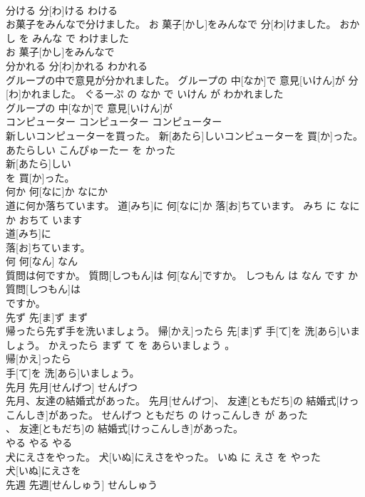 \documentclass[8pt]{extreport}
\begin{document}
\begin{CJK}{UTF8}{min}
\\	分ける	分[わ]ける	わける	
\\	お菓子をみんなで分けました。	お 菓子[かし]をみんなで 分[わ]けました。	おかし を みんな で わけました	
\\	お 菓子[かし]をみんなで
\\	分かれる	分[わ]かれる	わかれる	
\\	グループの中で意見が分かれました。	グループの 中[なか]で 意見[いけん]が 分[わ]かれました。	ぐるーぷ の なか で いけん が わかれました	
\\	グループの 中[なか]で 意見[いけん]が
\\	コンピューター	コンピューター	コンピューター	
\\	新しいコンピューターを買った。	新[あたら]しいコンピューターを 買[か]った。	あたらしい こんぴゅーたー を かった	
\\	新[あたら]しい
\\	を 買[か]った。			
\\	何か	何[なに]か	なにか	
\\	道に何か落ちています。	道[みち]に 何[なに]か 落[お]ちています。	みち に なにか おちて います	
\\	道[みち]に
\\	落[お]ちています。			
\\	何	何[なん]	なん	
\\	質問は何ですか。	質問[しつもん]は 何[なん]ですか。	しつもん は なん です か	
\\	質問[しつもん]は
\\	ですか。			
\\	先ず	先[ま]ず	まず	
\\	帰ったら先ず手を洗いましょう。	帰[かえ]ったら 先[ま]ず 手[て]を 洗[あら]いましょう。	かえったら まず て を あらいましょう 。	
\\	帰[かえ]ったら
\\	手[て]を 洗[あら]いましょう。			
\\	先月	先月[せんげつ]	せんげつ	
\\	先月、友達の結婚式があった。	先月[せんげつ]、 友達[ともだち]の 結婚式[けっこんしき]があった。	せんげつ ともだち の けっこんしき が あった	
\\	、 友達[ともだち]の 結婚式[けっこんしき]があった。			
\\	やる	やる	やる	
\\	犬にえさをやった。	犬[いぬ]にえさをやった。	いぬ に えさ を やった	
\\	犬[いぬ]にえさを
\\	先週	先週[せんしゅう]	せんしゅう	

\end{CJK}
\end{document}
